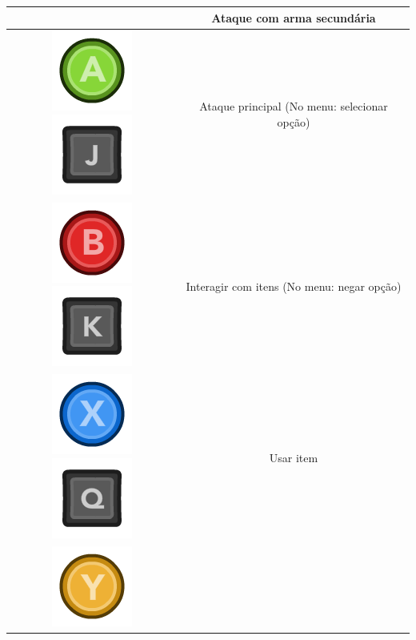 \documentclass{article}
\begin{document}
\begin{longtable}{|c|c|}
& Ataque com arma secundária
\\
\hline
\includegraphics[scale=0.3]{images/360_A.png}
\includegraphics[scale=0.3]{images/kJ.png}
& Ataque principal (No menu: selecionar opção)
\\
\hline
\includegraphics[scale=0.3]{images/360_B.png}
\includegraphics[scale=0.3]{images/kK.png}
& Interagir com itens (No menu: negar opção)
\\
\hline
\includegraphics[scale=0.3]{images/360_X.png}
\includegraphics[scale=0.3]{images/kQ.png}
& Usar item 
\\
\hline
\includegraphics[scale=0.3]{images/360_Y.png}

\end{longtable}
\end{document}
